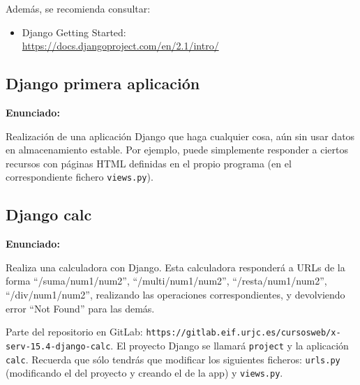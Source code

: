 Además, se recomienda consultar:

\begin{itemize}
\item Django Getting Started: \\
  \url{https://docs.djangoproject.com/en/2.1/intro/}
\end{itemize}

\subsection{Django primera aplicación}
\label{subsec:django-primera}

\textbf{Enunciado:}

Realización de una aplicación Django que haga cualquier cosa, aún sin usar datos en almacenamiento estable. Por ejemplo, puede simplemente responder a ciertos recursos con páginas HTML definidas en el propio programa (en el correspondiente fichero \texttt{views.py}).

\subsection{Django calc}
\label{subsec:django-calc}

\textbf{Enunciado:}

Realiza una calculadora con Django. Esta calculadora responderá a URLs de la forma ``/suma/num1/num2'', ``/multi/num1/num2'', ``/resta/num1/num2'', ``/div/num1/num2'', realizando las operaciones correspondientes, y devolviendo error ``Not Found'' para las demás.

Parte del repositorio en GitLab: \verb|https://gitlab.eif.urjc.es/cursosweb/x-serv-15.4-django-calc|. El proyecto Django se llamará \texttt{project} y la aplicación \texttt{calc}. 
Recuerda que sólo tendrás que modificar los siguientes ficheros: \texttt{urls.py} (modificando el del proyecto y creando el de la app) y \texttt{views.py}. 

%

